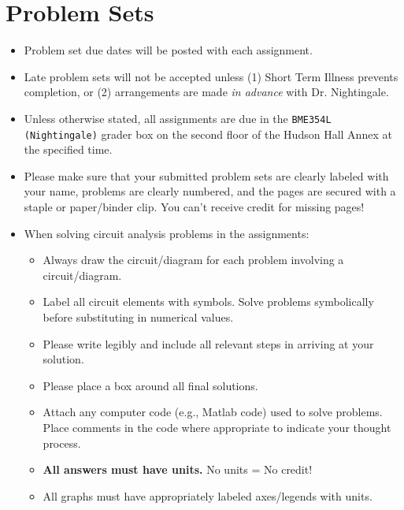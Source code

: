 \section{Problem Sets}
\begin{itemize}
    \item Problem set due dates will be posted with each assignment.  
    \item Late problem sets will not be accepted unless (1) Short Term Illness
        prevents completion, or (2) arrangements are made \emph{in advance}
        with Dr. Nightingale.
    \item Unless otherwise stated, all assignments are due in the \verb+BME354L (Nightingale)+ 
        grader box on the second floor of the Hudson Hall Annex at the
        specified time.  
    \item Please make sure that your submitted problem sets are clearly labeled
        with your name, problems are clearly numbered, and the pages are
        secured with a staple or paper/binder clip.  You can't receive credit
        for missing pages!
    \item When solving circuit analysis problems in the assignments:
        \begin{itemize}
            \item Always draw the circuit/diagram for each problem involving a
                circuit/diagram.
            \item Label all circuit elements with symbols.  Solve problems
                symbolically before substituting in numerical values.
            \item Please write legibly and include all relevant steps in
                arriving at your solution.
            \item Please place a box around all final solutions.
            \item Attach any computer code (e.g., Matlab code) used to solve
                problems.  Place comments in the code where appropriate to
                indicate your thought process.
            \item \textbf{All answers must have units.}  No units = No credit!
            \item All graphs must have appropriately labeled axes/legends with
                units.
        \end{itemize}
\end{itemize}
